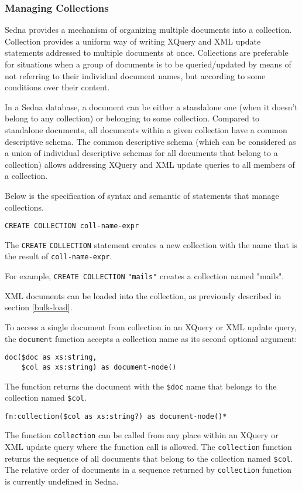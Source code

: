 \documentclass[a4paper,12pt]{article}
\begin{document}
\subsubsection{Managing Collections}

Sedna provides a mechanism of organizing multiple documents into a collection.
Collection provides a uniform way of writing XQuery and XML update statements
addressed to multiple documents at once. Collections are preferable for
situations when a group of documents is to be queried/updated by means of not
referring to their individual document names, but according to some conditions
over their content.

In a Sedna database, a document can be either a standalone one (when it doesn't
belong to any collection) or belonging to some collection. Compared to
standalone documents, all documents within a given collection have a common
descriptive schema. The common descriptive schema (which can be considered as a
union of individual descriptive schemas for all documents that belong to a
collection) allows addressing XQuery and XML update queries to all members of a
collection.

Below is the specification of syntax and semantic of statements that manage
collections.

\begin{verbatim}
CREATE COLLECTION coll-name-expr
\end{verbatim}

The \verb!CREATE! \verb!COLLECTION! statement creates a new collection with the
name that is the result of \verb!coll-name-expr!.

For example, \verb!CREATE COLLECTION! \verb!"mails"! creates a collection named
"mails".

XML documents can be loaded into the collection, as previously described in
section \ref{bulk-load}.

To access a single document from collection in an XQuery or XML update query,
the \verb!document! function accepts a collection name as its second optional
argument:
\begin{verbatim}
doc($doc as xs:string,
    $col as xs:string) as document-node()
\end{verbatim}
The function returns the document with the \verb!$doc! name that belongs to the
collection named \verb!$col!.

\begin{verbatim}
fn:collection($col as xs:string?) as document-node()*
\end{verbatim}
The function \verb!collection! can be called from any place within an XQuery or
XML update query where the function call is allowed. The \verb!collection!
function returns the sequence of all documents that belong to the collection
named \verb!$col!. The relative order of documents in a sequence returned by
\verb!collection! function is currently undefined in Sedna.
\end{document}
